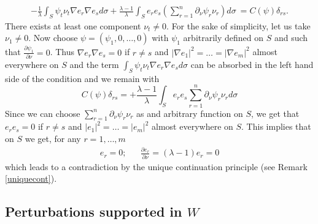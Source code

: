 \documentclass[a4paper,reqno,11pt,oneside]{amsart}
\theoremstyle{plain}
\theoremstyle{plain}
\theoremstyle{plain}
\theoremstyle{remark}
\begin{document}
  \begin{multline}\label{eq:splitS1}
    - \frac 1\lambda\int_{S}\psi_t\nu_t\nabla e_r\nabla e_s d\sigma
+\frac{\lambda-1}\lambda   \int_{S}e_r e_s \left(\sum_{r=1}^n \partial_\nu \psi_r \nu_r\right)d\sigma \ =
C(\psi)\delta_{rs}.
 \end{multline}
There exists at least one component $\nu_t \neq 0$. For the sake of simplicity, let us take $\nu_1\neq 0$.
Now choose $\psi=(\psi_1,0,\dots,0)$ with $\psi_1$ arbitrarily defined on $S$ and such that $\frac{\partial \psi_1} {\partial \nu}=0$. Thus  $\nabla e_r \nabla e_s=0$ if $r\neq s$ and $|\nabla e_1|^2=\dots=|\nabla e_m|^2$ almost everywhere on $S$ and the term $\int_{S}\psi_t\nu_t \nabla e_r\nabla e_s d\sigma$ can be absorbed in the left hand side of the condition and we remain with
\begin{equation}
     C(\psi)\delta_{rs}=
     +\frac{\lambda-1}\lambda \int_{ S}  e_r  e_s\sum_{r=1}^n \partial_\nu \psi_r \nu_r d\sigma
\end{equation}
Since we can choose $\sum_{r=1}^n \partial_\nu \psi_r \nu_r $ as and arbitrary function on $S$, we get that $ e_r  e_s=0$ if $r\neq s$ and $| e_1|^2=\dots=| e_m|^2$ almost everywhere on $S$. This implies that on $S$ we get, for any $r=1,\dots, m$
\begin{eqnarray}
    e_r=0;&& \frac{\partial e_r}{\partial \nu}=(\lambda-1) e_r=0
\end{eqnarray}
which leads to a contradiction by the unique continuation principle (see Remark \ref{uniquecont}).

\subsection{Perturbations supported in $W$}
\end{document}
